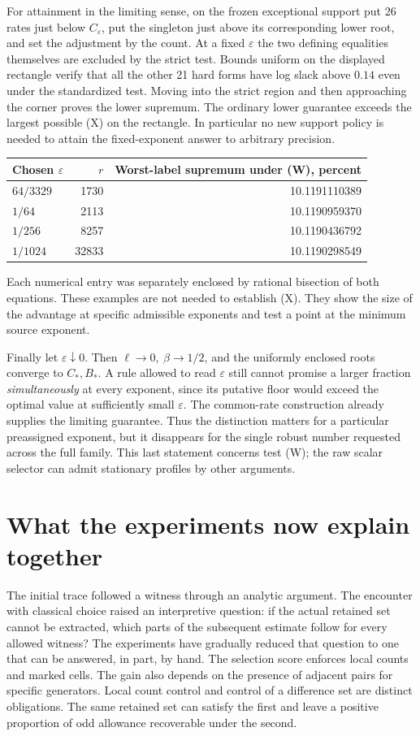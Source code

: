 \documentclass[12pt,letterpaper]{article}
\begin{document}
For attainment in the limiting sense, on the frozen exceptional support put 26 rates just below \(C_\varepsilon\), put the singleton just above its corresponding lower root, and set the adjustment by the count. At a fixed \(\varepsilon\) the two defining equalities themselves are excluded by the strict test. Bounds uniform on the displayed rectangle verify that all the other 21 hard forms have log slack above \(0.14\) even under the standardized test. Moving into the strict region and then approaching the corner proves the lower supremum. The ordinary lower guarantee exceeds the largest possible (X) on the rectangle. In particular no new support policy is needed to attain the fixed-exponent answer to arbitrary precision.

\begin{center}\small\begin{tabular}{@{}lrr@{}}\toprule
Chosen \(\varepsilon\)& \(r\)&Worst-label supremum under (W), percent\\\midrule
\(64/3329\)&1730&10.1191110389\\
\(1/64\)&2113&10.1190959370\\
\(1/256\)&8257&10.1190436792\\
\(1/1024\)&32833&10.1190298549\\\bottomrule
\end{tabular}\end{center}
Each numerical entry was separately enclosed by rational bisection of both equations. These examples are not needed to establish (X). They show the size of the advantage at specific admissible exponents and test a point at the minimum source exponent.

Finally let \(\varepsilon\downarrow0\). Then \(\ell\to0,\ \beta\to1/2\), and the uniformly enclosed roots converge to \(C_*,B_*\). A rule allowed to read \(\varepsilon\) still cannot promise a larger fraction \emph{simultaneously} at every exponent, since its putative floor would exceed the optimal value at sufficiently small \(\varepsilon\). The common-rate construction already supplies the limiting guarantee. Thus the distinction matters for a particular preassigned exponent, but it disappears for the single robust number requested across the full family. This last statement concerns test (W); the raw scalar selector can admit stationary profiles by other arguments.
\section{What the experiments now explain together}
\label{sec:synthesis}
The initial trace followed a witness through an analytic argument. The encounter with classical choice raised an interpretive question: if the actual retained set cannot be extracted, which parts of the subsequent estimate follow for every allowed witness? The experiments have gradually reduced that question to one that can be answered, in part, by hand. The selection score enforces local counts and marked cells. The gain also depends on the presence of adjacent pairs for specific generators. Local count control and control of a difference set are distinct obligations. The same retained set can satisfy the first and leave a positive proportion of odd allowance recoverable under the second.
\end{document}
